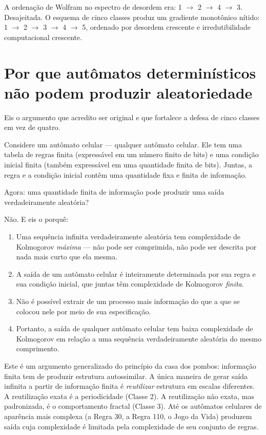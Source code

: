 \documentclass[11pt, twoside, openright]{book}
\begin{document}
A ordenação de Wolfram no espectro de desordem era: 1 $\rightarrow$ 2 $\rightarrow$ 4 $\rightarrow$ 3. Desajeitada. O esquema de cinco classes produz um gradiente monotônico nítido: 1 $\rightarrow$ 2 $\rightarrow$ 3 $\rightarrow$ 4 $\rightarrow$ 5, ordenado por desordem crescente e irredutibilidade computacional crescente.

\section*{Por que autômatos determinísticos não podem produzir aleatoriedade}

Eis o argumento que acredito ser original e que fortalece a defesa de cinco classes em vez de quatro.

Considere um autômato celular --- qualquer autômato celular. Ele tem uma tabela de regras finita (expressável em um número finito de bits) e uma condição inicial finita (também expressável em uma quantidade finita de bits). Juntas, a regra e a condição inicial contêm uma quantidade fixa e finita de informação.

Agora: uma quantidade finita de informação pode produzir uma saída verdadeiramente aleatória?

Não. E eis o porquê:

\begin{enumerate}
  \item Uma sequência infinita verdadeiramente aleatória tem complexidade de Kolmogorov \textit{máxima} --- não pode ser comprimida, não pode ser descrita por nada mais curto que ela mesma.
  \item A saída de um autômato celular é inteiramente determinada por sua regra e sua condição inicial, que juntas têm complexidade de Kolmogorov \textit{finita}.
  \item Não é possível extrair de um processo mais informação do que a que se colocou nele por meio de sua especificação.
  \item Portanto, a saída de qualquer autômato celular tem baixa complexidade de Kolmogorov em relação a uma sequência verdadeiramente aleatória do mesmo comprimento.
\end{enumerate}

Este é um argumento generalizado do princípio da casa dos pombos: informação finita tem de produzir estrutura autossimilar. A única maneira de gerar saída infinita a partir de informação finita é \textit{reutilizar} estrutura em escalas diferentes. A reutilização exata é a periodicidade (Classe 2). A reutilização não exata, mas padronizada, é o comportamento fractal (Classe 3). Até os autômatos celulares de aparência mais complexa (a Regra 30, a Regra 110, o Jogo da Vida) produzem saída cuja complexidade é limitada pela complexidade de seu conjunto de regras.
\end{document}
